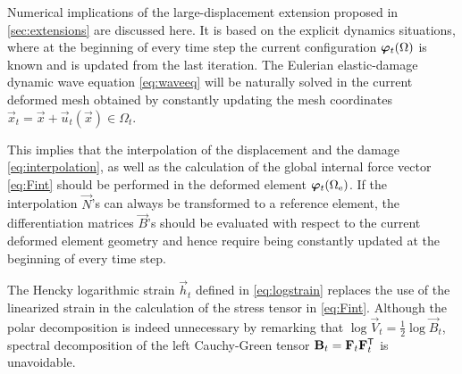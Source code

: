 \begin{remark}
Numerical implications of the large-displacement extension proposed in \cref{sec:extensions} are discussed here. It is based on the explicit dynamics situations, where at the beginning of every time step the current configuration $\vphi_t(\Omega)$ is known and is updated from the last iteration. The Eulerian elastic-damage dynamic wave equation \eqref{eq:waveeq} will be naturally solved in the current deformed mesh obtained by constantly updating the mesh coordinates $\vec{x}_t=\vec{x}+\vec{u}_t(\vec{x})\in\Omega_t$.

This implies that the interpolation of the displacement and the damage \eqref{eq:interpolation}, as well as the calculation of the global internal force vector \eqref{eq:Fint} should be performed in the deformed element $\vphi_t(\Omega_\mathrm{e})$. If the interpolation $\vec{N}$'s can always be transformed to a reference element, the differentiation matrices $\vec{B}$'s should be evaluated with respect to the current deformed element geometry and hence require being constantly updated at the beginning of every time step.

The Hencky logarithmic strain $\vec{h}_t$ defined in \eqref{eq:logstrain} replaces the use of the linearized strain in the calculation of the stress tensor in \eqref{eq:Fint}. Although the polar decomposition is indeed unnecessary by remarking that $\log\vec{V}_t=\frac{1}{2}\log\vec{B}_t$, spectral decomposition of the left Cauchy-Green tensor $\vec{B}_t=\vec{F}_t\vec{F}_t^\mT$ is unavoidable.
\end{remark}

